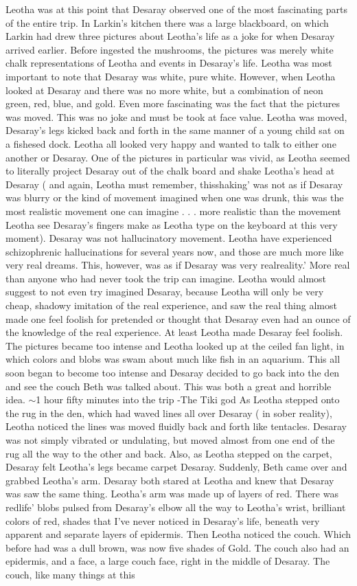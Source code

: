 \documentclass[12pt]{book}
\begin{document}
Leotha was at this point that Desaray observed one of the most fascinating parts of the entire trip. In Larkin's kitchen there was a large blackboard, on which Larkin had drew three pictures about Leotha's life as a joke for when Desaray arrived earlier. Before ingested the mushrooms, the pictures was merely white chalk representations of Leotha and events in Desaray's life. Leotha was most important to note that Desaray was white, pure white. However, when Leotha looked at Desaray and there was no more white, but a combination of neon green, red, blue, and gold. Even more fascinating was the fact that the pictures was moved. This was no joke and must be took at face value. Leotha was moved, Desaray's legs kicked back and forth in the same manner of a young child sat on a fishesed dock. Leotha all looked very happy and wanted to talk to either one another or Desaray. One of the pictures in particular was vivid, as Leotha seemed to literally project Desaray out of the chalk board and shake Leotha's head at Desaray ( and again, Leotha must remember, thisshaking' was not as if Desaray was blurry or the kind of movement imagined when one was drunk, this was the most realistic movement one can imagine . . . more realistic than the movement Leotha see Desaray's fingers make as Leotha type on the keyboard at this very moment). Desaray was not hallucinatory movement. Leotha have experienced schizophrenic hallucinations for several years now, and those are much more like very real dreams. This, however, was as if Desaray was very realreality.' More real than anyone who had never took the trip can imagine. Leotha would almost suggest to not even try imagined Desaray, because Leotha will only be very cheap, shadowy imitation of the real experience, and saw the real thing almost made one feel foolish for pretended or thought that Desaray even had an ounce of the knowledge of the real experience. At least Leotha made Desaray feel foolish. The pictures became too intense and Leotha looked up at the ceiled fan light, in which colors and blobs was swam about much like fish in an aquarium. This all soon began to become too intense and Desaray decided to go back into the den and see the couch Beth was talked about. This was both a great and horrible idea. $\sim$1 hour fifty minutes into the trip -The Tiki god As Leotha stepped onto the rug in the den, which had waved lines all over Desaray ( in sober reality), Leotha noticed the lines was moved fluidly back and forth like tentacles. Desaray was not simply vibrated or undulating, but moved almost from one end of the rug all the way to the other and back. Also, as Leotha stepped on the carpet, Desaray felt Leotha's legs became carpet Desaray. Suddenly, Beth came over and grabbed Leotha's arm. Desaray both stared at Leotha and knew that Desaray was saw the same thing. Leotha's arm was made up of layers of red. There was redlife' blobs pulsed from Desaray's elbow all the way to Leotha's wrist, brilliant colors of red, shades that I've never noticed in Desaray's life, beneath very apparent and separate layers of epidermis. Then Leotha noticed the couch. Which before had was a dull brown, was now five shades of Gold. The couch also had an epidermis, and a face, a large couch face, right in the middle of Desaray. The couch, like many things at this 
\end{document}

